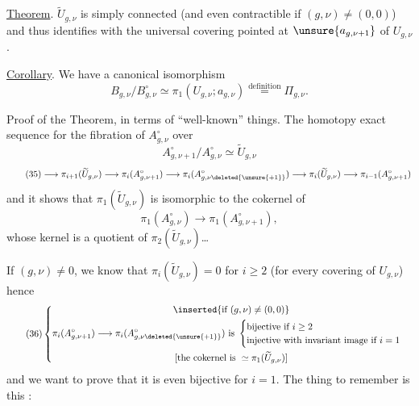 \uline{Theorem}. $\widetilde U_{g,\nu}$ is simply connected  (and even contractible if $(g,\nu)\ne(0,0)$) and thus identifies with the universal covering pointed at $\unsure{a_{g,\nu+1}}$ of $U_{g,\nu}$.


\uline{Corollary}. We have a canonical isomorphism
\[
\tag{34}
B_{g,\nu}/B_{g,\nu}^{\circ}\simeq\pi_1(U_{g,\nu};a_{g,\nu})\overset{\text{definition}}{=}\Pi_{g,\nu}.
\]

Proof of the Theorem, in terms of ``well-known'' things. The  homotopy exact sequence for the fibration of $A_{g,\nu}^{\circ}$ over
\[
A_{g,\nu+1}^{\circ}/A_{g,\nu}^{\circ}\simeq\widetilde U_{g,\nu}
\]
\[
\tag{35}
\longrightarrow\pi_{i+1}(\widetilde U_{g,\nu})
\longrightarrow\pi_i(A_{g,\nu+1}^{\circ})
\longrightarrow\pi_i(A_{g,\nu\deleted{\unsure{+1}}}^{\circ})
\longrightarrow\pi_i(\widetilde U_{g,\nu})
\longrightarrow\pi_{i-1}(A_{g,\nu+1}^{\circ})
\]
and it shows that $\pi_1(\widetilde U_{g,\nu})$ is isomorphic to the cokernel of
\[
\pi_1(A_{g,\nu}^{\circ})\longrightarrow\pi_1(A_{g,\nu+1}^{\circ}),
\]
whose kernel is a quotient of $\pi_2(\widetilde U_{g,\nu})$\ldots

If $(g,\nu)\ne0$, we know that $\pi_i(\widetilde U_{g,\nu})=0$ for $i\geq2$ (for every covering of $U_{g,\nu}$) hence
\[
\tag{36}
\left\{\begin{gathered}
\inserted{\text{if }(g,\nu)\ne(0,0)}\\
\pi_i(A_{g,\nu+1}^{\circ})\longrightarrow\pi_i(A_{g,\nu\deleted{\unsure{+1}}}^{\circ})
\text{ is }\begin{cases}
\text{bijective if }i\geq2\\
\text{injective with invariant image if }i=1
\end{cases}\\
\text{[the cokernel is }\simeq\pi_1(\widetilde U_{g,\nu})\text{]}
\end{gathered}\right.
\]
and we want to prove that it is even bijective for $i=1$. The thing to remember  is this :

